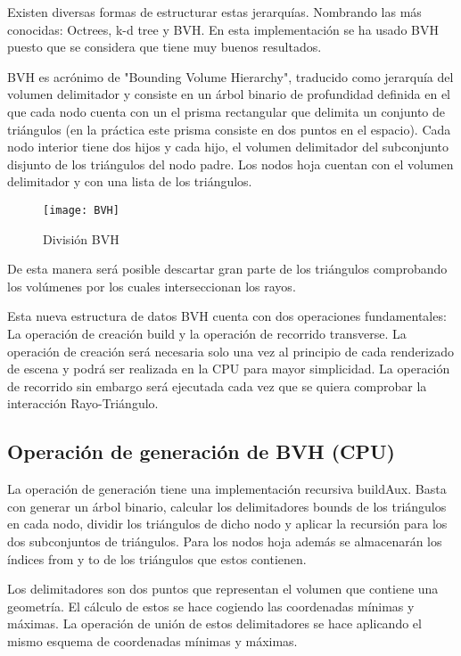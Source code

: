 Existen diversas formas de estructurar estas jerarquías. Nombrando las más conocidas: Octrees, k-d tree y BVH. En esta implementación se ha usado BVH puesto que se considera que tiene muy buenos resultados.

BVH es acrónimo de "Bounding Volume Hierarchy", traducido como jerarquía del volumen delimitador y consiste en un árbol binario de profundidad definida en el que cada nodo cuenta con un el prisma rectangular que delimita un conjunto de triángulos (en la práctica este prisma consiste en dos puntos en el espacio). Cada nodo interior tiene dos hijos y cada hijo, el volumen delimitador del subconjunto disjunto de los triángulos del nodo padre. Los nodos hoja cuentan con el volumen delimitador y con una lista de los triángulos.

\begin{figure}
    \centering
	\texttt{[image: BVH]}
	\caption{División BVH}
	\label{fig:label}
\end{figure}

De esta manera será posible descartar gran parte de los triángulos comprobando los volúmenes por los cuales interseccionan los rayos.

Esta nueva estructura de datos BVH cuenta con dos operaciones fundamentales: La operación de creación build y la operación de recorrido transverse. La operación de creación será necesaria solo una vez al principio de cada renderizado de escena y podrá ser realizada en la CPU para mayor simplicidad. La operación de recorrido sin embargo será ejecutada cada vez que se quiera comprobar la interacción Rayo-Triángulo.



\subsection{Operación de generación de BVH (CPU)}


La operación de generación tiene una implementación recursiva buildAux. Basta con generar un árbol binario, calcular los delimitadores bounds de los triángulos en cada nodo, dividir los triángulos de dicho nodo y aplicar la recursión para los dos subconjuntos de triángulos. Para los nodos hoja además se almacenarán los índices from y to de los triángulos que estos contienen.

Los delimitadores son dos puntos que representan el volumen que contiene una geometría. El cálculo de estos se hace cogiendo las coordenadas mínimas y máximas. La operación de unión de estos delimitadores se hace aplicando el mismo esquema de coordenadas mínimas y máximas.


